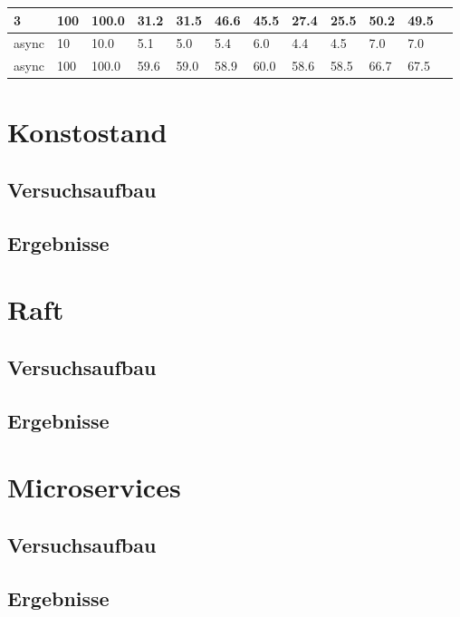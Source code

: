 \documentclass[12pt,a4paper]{report}
\begin{document}
\begin{table}[h]
\begin{tabular}{|l|l|l|l|l|l|l|l|l|l|l|l|}
		3                        & 100                                & 100.0                           & 31.2                        & 31.5                      & 46.6                           & 45.5   & 27.4 & 25.5   & 50.2 & 49.5   \\ \hline
		async                    & 10                                 & 10.0                            & 5.1                         & 5.0                       & 5.4                            & 6.0    & 4.4  & 4.5    & 7.0  & 7.0    \\ \hline
		async                    & 100                                & 100.0                           & 59.6                        & 59.0                      & 58.9                           & 60.0   & 58.6 & 58.5   & 66.7 & 67.5   \\ \hline
	\end{tabular}
\end{table}


\section{Konstostand}
\subsection{Versuchsaufbau}
\subsection{Ergebnisse}
\section{Raft}
\subsection{Versuchsaufbau}
\subsection{Ergebnisse}
\section{Microservices}
\subsection{Versuchsaufbau}
\subsection{Ergebnisse}
\end{document}
